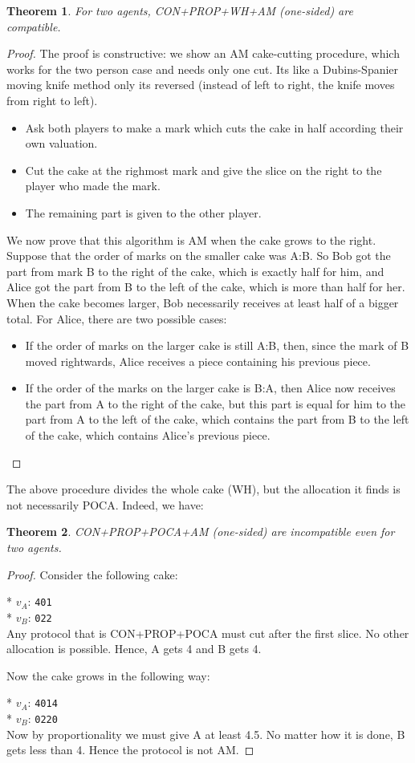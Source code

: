 \documentclass[a4paper,12pt]{article}
\newcommand{\biexample}[2]{
* \hspace{1cm}   $v_A$: \texttt{#1} \\
* \hspace{1cm}   $v_B$: \texttt{#2} \\
}
\newtheorem{thm}{Theorem}[section]
\begin{document}
\begin{thm}
For two agents, CON+PROP+WH+AM (one-sided) are compatible.
\end{thm}
\begin{proof}
The proof is constructive: we show an AM cake-cutting procedure, which works for the two person case and needs only one cut. Its like a Dubins-Spanier moving knife method only its reversed (instead of left to right, the knife moves from right to left).
\begin{itemize}
\item{Ask both players to make a mark which cuts the cake in half according their own valuation.}
\item{Cut the cake at the righmost mark and give the slice on the right to the player who made the mark.}
\item{The remaining part is given to the other player.}
\end{itemize}


We now prove that this algorithm is AM when the cake grows to the right. Suppose that the order of marks on the smaller cake was A:B. So Bob got the part from mark B to the right of the cake, which is exactly half for him, and Alice got the part from B to the left of the cake, which is more than half for her. When the cake becomes larger, Bob necessarily receives at least half of a bigger total. For Alice, there are two possible cases:
\begin{itemize}
\item{If the order of marks on the larger cake is still A:B, then, since the mark of B moved rightwards, Alice receives a piece containing his previous piece.}
\item{If the order of the marks on the larger cake is B:A, then Alice now receives the part from A to the right of the cake, but this part is equal for him to the part from A to the left of the cake, which contains the part from B to the left of the cake, which contains Alice's previous piece.}
\end{itemize}
\end{proof}

The above procedure divides the whole cake (WH), but the allocation it finds is not necessarily POCA. Indeed, we have:

\begin{thm}
CON+PROP+POCA+AM (one-sided) are incompatible even for two agents.
\end{thm}
\begin{proof}
Consider the following cake:

\biexample{401}{022}

Any protocol that is CON+PROP+POCA must cut after the first slice. No other allocation is possible. Hence, A gets 4 and B gets 4.

Now the cake grows in the following way:

\biexample{4014}{0220}

Now by proportionality we must give A at least 4.5. No matter how it is done, B gets less than 4. Hence the protocol is not AM.
\end{proof}
\end{document}
